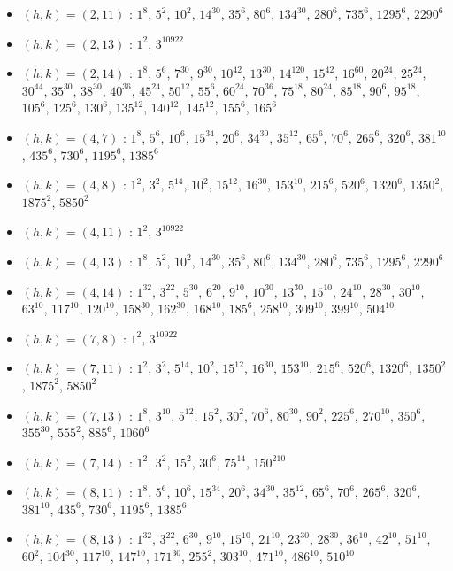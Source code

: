\begin{itemize}
\item $(h,k)=(2,11)$ : $1^{8}$, $5^{2}$, $10^{2}$, $14^{30}$, $35^{6}$, $80^{6}$, $134^{30}$, $280^{6}$, $735^{6}$, $1295^{6}$, $2290^{6}$
\item $(h,k)=(2,13)$ : $1^{2}$, $3^{10922}$
\item $(h,k)=(2,14)$ : $1^{8}$, $5^{6}$, $7^{30}$, $9^{30}$, $10^{42}$, $13^{30}$, $14^{120}$, $15^{42}$, $16^{60}$, $20^{24}$, $25^{24}$, $30^{44}$, $35^{30}$, $38^{30}$, $40^{36}$, $45^{24}$, $50^{12}$, $55^{6}$, $60^{24}$, $70^{36}$, $75^{18}$, $80^{24}$, $85^{18}$, $90^{6}$, $95^{18}$, $105^{6}$, $125^{6}$, $130^{6}$, $135^{12}$, $140^{12}$, $145^{12}$, $155^{6}$, $165^{6}$
\item $(h,k)=(4,7)$ : $1^{8}$, $5^{6}$, $10^{6}$, $15^{34}$, $20^{6}$, $34^{30}$, $35^{12}$, $65^{6}$, $70^{6}$, $265^{6}$, $320^{6}$, $381^{10}$, $435^{6}$, $730^{6}$, $1195^{6}$, $1385^{6}$
\item $(h,k)=(4,8)$ : $1^{2}$, $3^{2}$, $5^{14}$, $10^{2}$, $15^{12}$, $16^{30}$, $153^{10}$, $215^{6}$, $520^{6}$, $1320^{6}$, $1350^{2}$, $1875^{2}$, $5850^{2}$
\item $(h,k)=(4,11)$ : $1^{2}$, $3^{10922}$
\item $(h,k)=(4,13)$ : $1^{8}$, $5^{2}$, $10^{2}$, $14^{30}$, $35^{6}$, $80^{6}$, $134^{30}$, $280^{6}$, $735^{6}$, $1295^{6}$, $2290^{6}$
\item $(h,k)=(4,14)$ : $1^{32}$, $3^{22}$, $5^{30}$, $6^{20}$, $9^{10}$, $10^{30}$, $13^{30}$, $15^{10}$, $24^{10}$, $28^{30}$, $30^{10}$, $63^{10}$, $117^{10}$, $120^{10}$, $158^{30}$, $162^{30}$, $168^{10}$, $185^{6}$, $258^{10}$, $309^{10}$, $399^{10}$, $504^{10}$
\item $(h,k)=(7,8)$ : $1^{2}$, $3^{10922}$
\item $(h,k)=(7,11)$ : $1^{2}$, $3^{2}$, $5^{14}$, $10^{2}$, $15^{12}$, $16^{30}$, $153^{10}$, $215^{6}$, $520^{6}$, $1320^{6}$, $1350^{2}$, $1875^{2}$, $5850^{2}$
\item $(h,k)=(7,13)$ : $1^{8}$, $3^{10}$, $5^{12}$, $15^{2}$, $30^{2}$, $70^{6}$, $80^{30}$, $90^{2}$, $225^{6}$, $270^{10}$, $350^{6}$, $355^{30}$, $555^{2}$, $885^{6}$, $1060^{6}$
\item $(h,k)=(7,14)$ : $1^{2}$, $3^{2}$, $15^{2}$, $30^{6}$, $75^{14}$, $150^{210}$
\item $(h,k)=(8,11)$ : $1^{8}$, $5^{6}$, $10^{6}$, $15^{34}$, $20^{6}$, $34^{30}$, $35^{12}$, $65^{6}$, $70^{6}$, $265^{6}$, $320^{6}$, $381^{10}$, $435^{6}$, $730^{6}$, $1195^{6}$, $1385^{6}$
\item $(h,k)=(8,13)$ : $1^{32}$, $3^{22}$, $6^{30}$, $9^{10}$, $15^{10}$, $21^{10}$, $23^{30}$, $28^{30}$, $36^{10}$, $42^{10}$, $51^{10}$, $60^{2}$, $104^{30}$, $117^{10}$, $147^{10}$, $171^{30}$, $255^{2}$, $303^{10}$, $471^{10}$, $486^{10}$, $510^{10}$

\end{itemize}
